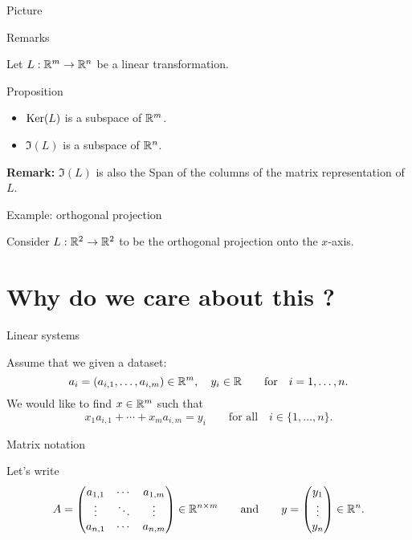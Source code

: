\documentclass{beamer}
\begin{document}
\begin{frame}[t]{Picture}
	\grid
\end{frame}

\begin{frame}[t]{Remarks}
	\grid

	Let \quad $L: \mathbb{R}^m \to \mathbb{R}^n$ \quad be a linear transformation.
	\begin{block}{Proposition}
		\begin{itemize}
			\item ${{\rm Ker}}(L)$ is a subspace of $\mathbb{R}^m$.
			\item $\Im(L)$ is a subspace of $\mathbb{R}^n$.
		\end{itemize}
	\end{block}
	\textbf{Remark:} $\Im(L)$ is also the Span of the columns of the matrix representation of $L$.

\end{frame}

\begin{frame}[t]{Example: orthogonal projection}
	\grid

	Consider \quad $L: \mathbb{R}^2 \to \mathbb{R}^2$ \quad to be the orthogonal projection onto the $x$-axis.
\end{frame}


\section{Why do we care about this ?}

\begin{frame}[t]{Linear systems}
	\grid

	Assume that we given a dataset:
	$$
	a_i = (a_{i,1}, \dots, a_{i,m}) \in \mathbb{R}^m, \quad y_i \in \mathbb{R} \qquad \text{for} \quad i = 1, \dots, n.
	$$
	We would like to find $x \in \mathbb{R}^m$ such that
	$$
	x_1 a_{i,1} + \cdots + x_m a_{i,m} = y_i \qquad \text{for all} \quad i \in \{1, \dots, n\}.
	$$
\end{frame}

\begin{frame}[t]{Matrix notation}
	\grid

	\vspace{-0.3cm}
	Let's write
	$$
	A = 
	\begin{pmatrix}
		a_{1,1}  & \cdots & a_{1,m} \\
		\vdots & \ddots & \vdots \\
		a_{n,1} & \cdots & a_{n,m} \\
	\end{pmatrix} \in \mathbb{R}^{n \times m}
	\qquad \text{and} \qquad
	y = 
	\begin{pmatrix}
		y_1 \\
		\vdots \\
		y_n
	\end{pmatrix}
	\in \mathbb{R}^n.
	$$
\end{frame}
\end{document}
